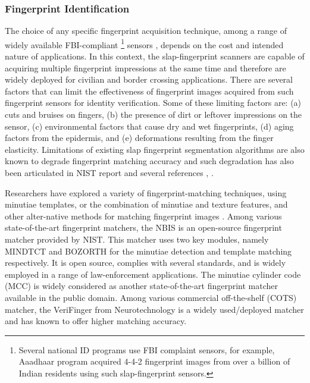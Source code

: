 \subsubsection{Fingerprint Identification\label{realate-work-fp}}
The choice of any specific fingerprint acquisition technique, among a range of widely available FBI-compliant \footnote[1]{Several national ID programs use FBI complaint sensors, for example, Aaadhaar program acquired 4-4-2 fingerprint images from over a billion of Indian residents using such \cite{fbi-sensor} slap-fingerprint sensors.} sensors \cite{fbi-sensor}, depends on the cost and intended nature of applications. In this context, the slap-fingerprint scanners are capable of acquiring multiple fingerprint impressions at the same time and therefore are widely deployed for civilian and border crossing applications. There are several factors that can limit the effectiveness of ﬁngerprint images acquired from such fingerprint sensors for identity verification. Some of these limiting factors are: (a) cuts and bruises on ﬁngers, (b) the presence of dirt or leftover impressions on the sensor, (c) environmental factors that cause dry and wet fingerprints, (d) aging factors from the epidermis, and (e) deformations resulting from the finger elasticity. Limitations of existing slap fingerprint segmentation algorithms are also known to degrade fingerprint matching accuracy and such degradation has also been articulated in NIST report \cite{watson2009slapssegii} and several references \cite{maltoni2009handbook}, \cite{zhang2010slap}.

Researchers have explored a variety of fingerprint-matching techniques, using minutiae templates, or the combination of minutiae and texture features, and other alter-native methods for matching fingerprint images \cite{maltoni2009handbook}. Among various state-of-the-art fingerprint matchers, the NBIS \cite{watson2007user} is an open-source fingerprint matcher provided by NIST. This matcher uses two key modules, namely MINDTCT and BOZORTH for the minutiae detection and template matching respectively. It is open source, complies with several standards, and is widely employed in a range of law-enforcement applications. The minutiae cylinder code (MCC) \cite{cappelli2010minutia} is widely considered as another state-of-the-art fingerprint matcher available in the public domain. Among various commercial off-the-shelf (COTS) matcher, the VeriFinger from Neurotechnology \cite{verifinger} is a widely used/deployed matcher and has known to offer higher matching accuracy. 


